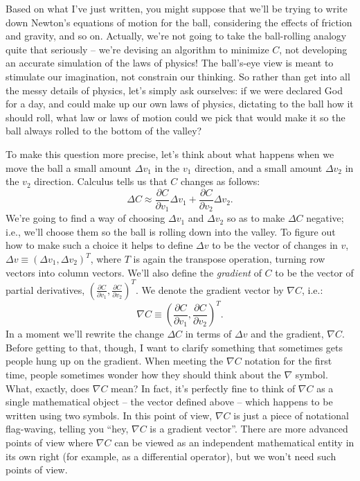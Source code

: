 \documentclass[a4paper,twoside,10pt]{book}
\begin{document}
Based on what I've just written, you might suppose that we'll be trying to write down Newton's equations of motion for the ball, considering the effects of friction and gravity, and so on. Actually, we're not going to take the ball-rolling analogy quite that seriously -- we're devising an algorithm to minimize $C$, not developing an accurate simulation of the laws of physics! The ball's-eye view is meant to stimulate our imagination, not constrain our thinking. So rather than get into all the messy details of physics, let's simply ask ourselves: if we were declared God for a day, and could make up our own laws of physics, dictating to the ball how it should roll, what law or laws of motion could we pick that would make it so the ball always rolled to the bottom of the valley?

To make this question more precise, let's think about what happens when we move the ball a small amount $\Delta v_1$ in the $v_1$ direction, and a small amount $\Delta v_2$ in the $v_2$ direction. Calculus tells us that $C$ changes as follows:
\begin{equation}
	\Delta C \approx \frac{\partial C}{\partial v_1} \Delta v_1 + \frac{\partial C}{\partial v_2} \Delta v_2.
	\tag{7}\label{eq:7}
\end{equation}
We're going to find a way of choosing $\Delta v_1$ and $\Delta v_2$ so as to make $\Delta C$ negative; i.e., we'll choose them so the ball is rolling down into the valley. To figure out how to make such a choice it helps to define $\Delta v$ to be the vector of changes in $v$, $\Delta v \equiv (\Delta v_1, \Delta v_2)^T$, where $T$ is again the transpose operation, turning row vectors into column vectors. We'll also define the \textit{gradient} of $C$ to be the vector of partial derivatives, $\left(\frac{\partial
	C}{\partial v_1}, \frac{\partial C}{\partial v_2}\right)^T$. We denote the gradient vector by $\nabla C$, i.e.:
\begin{equation}
\nabla C \equiv \left( \frac{\partial C}{\partial v_1}, \frac{\partial C}{\partial v_2} \right)^T.
\tag{8}\label{eq:8}
\end{equation}
In a moment we'll rewrite the change $\Delta C$ in terms of $\Delta{}v$ and the gradient, $\nabla C$. Before getting to that, though, I want to clarify something that sometimes gets people hung up on the gradient. When meeting the $\nabla C$ notation for the first time, people sometimes wonder how they should think about the $\nabla$ symbol. What, exactly, does $\nabla C$ mean? In fact, it's perfectly fine to think of $\nabla C$ as a single mathematical object -- the vector defined above -- which happens to be written using two symbols. In this point of view, $\nabla C$ is just a piece of notational flag-waving, telling you ``hey, $\nabla C$ is a gradient vector''. There are more advanced points of view where $\nabla C$ can be viewed as an independent mathematical entity in its own right (for example, as a differential operator), but we won't need such points of view.
\end{document}

